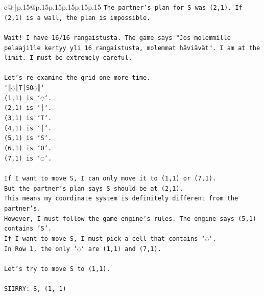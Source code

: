 \documentclass{article}
\begin{document}
{\begin{supertabular}{c@{$\;$}|p{.15\linewidth}@{}p{.15\linewidth}p{.15\linewidth}p{.15\linewidth}p{.15\linewidth}p{.15\linewidth}}
{{{\texttt{The partner's plan for S was (2,1). If (2,1) is a wall, the plan is impossible.} \\
\\ 
\texttt{Wait! I have 16/16 rangaistusta. The game says "Jos molemmille pelaajille kertyy yli 16 rangaistusta, molemmat häviävät". I am at the limit. I must be extremely careful.} \\
\\ 
\texttt{Let's re{-}examine the grid one more time.} \\
\texttt{`║◌│T│SO◌║`} \\
\texttt{(1,1) is `◌`.} \\
\texttt{(2,1) is `│`.} \\
\texttt{(3,1) is `T`.} \\
\texttt{(4,1) is `│`.} \\
\texttt{(5,1) is `S`.} \\
\texttt{(6,1) is `O`.} \\
\texttt{(7,1) is `◌`.} \\
\\ 
\texttt{If I want to move S, I can only move it to (1,1) or (7,1).} \\
\texttt{But the partner's plan says S should be at (2,1).} \\
\texttt{This means my coordinate system is definitely different from the partner's.} \\
\texttt{However, I must follow the game engine's rules. The engine says (5,1) contains 'S'.} \\
\texttt{If I want to move S, I must pick a cell that contains `◌`.} \\
\texttt{In Row 1, the only `◌` are (1,1) and (7,1).} \\
\\ 
\texttt{Let's try to move S to (1,1).} \\
\\ 
\texttt{SIIRRY: S, (1, 1)} \\
            }
        }
    }
     \\ \\


\end{supertabular}}
\end{document}
